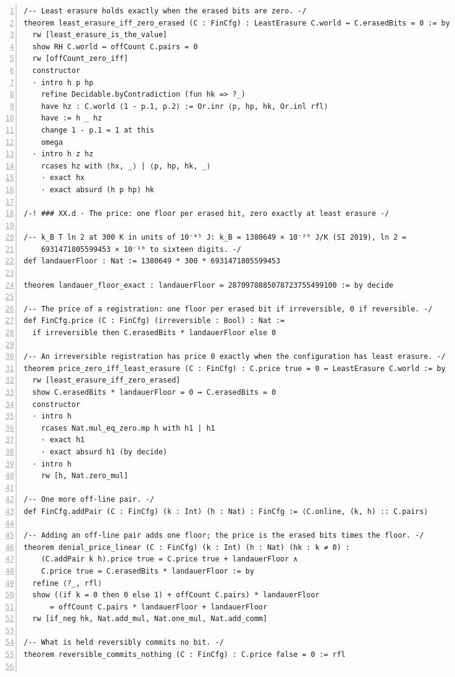\documentclass[10pt]{article}
\newcommand{\leansize}{\fontsize{5.5pt}{6.75pt}\selectfont}
\begin{document}
\begin{multicols}{2}
\begin{Verbatim}[numbers=left,firstnumber=1,numbersep=3pt,xleftmargin=2.6em,breaklines=true,breakanywhere=true,breakautoindent=false,breakindent=1.4em,breaksymbolleft={},breakanywheresymbolpre={},fontsize=\leansize]
/-- Least erasure holds exactly when the erased bits are zero. -/
theorem least_erasure_iff_zero_erased (C : FinCfg) : LeastErasure C.world ↔ C.erasedBits = 0 := by
  rw [least_erasure_is_the_value]
  show RH C.world ↔ offCount C.pairs = 0
  rw [offCount_zero_iff]
  constructor
  · intro h p hp
    refine Decidable.byContradiction (fun hk => ?_)
    have hz : C.world ⟨1 - p.1, p.2⟩ := Or.inr ⟨p, hp, hk, Or.inl rfl⟩
    have := h _ hz
    change 1 - p.1 = 1 at this
    omega
  · intro h z hz
    rcases hz with ⟨hx, _⟩ | ⟨p, hp, hk, _⟩
    · exact hx
    · exact absurd (h p hp) hk

/-! ### XX.d · The price: one floor per erased bit, zero exactly at least erasure -/

/-- k_B T ln 2 at 300 K in units of 10⁻⁴⁵ J: k_B = 1380649 × 10⁻²⁹ J/K (SI 2019), ln 2 =
    6931471805599453 × 10⁻¹⁶ to sixteen digits. -/
def landauerFloor : Nat := 1380649 * 300 * 6931471805599453

theorem landauer_floor_exact : landauerFloor = 2870978885078723755499100 := by decide

/-- The price of a registration: one floor per erased bit if irreversible, 0 if reversible. -/
def FinCfg.price (C : FinCfg) (irreversible : Bool) : Nat :=
  if irreversible then C.erasedBits * landauerFloor else 0

/-- An irreversible registration has price 0 exactly when the configuration has least erasure. -/
theorem price_zero_iff_least_erasure (C : FinCfg) : C.price true = 0 ↔ LeastErasure C.world := by
  rw [least_erasure_iff_zero_erased]
  show C.erasedBits * landauerFloor = 0 ↔ C.erasedBits = 0
  constructor
  · intro h
    rcases Nat.mul_eq_zero.mp h with h1 | h1
    · exact h1
    · exact absurd h1 (by decide)
  · intro h
    rw [h, Nat.zero_mul]

/-- One more off-line pair. -/
def FinCfg.addPair (C : FinCfg) (k : Int) (h : Nat) : FinCfg := ⟨C.online, (k, h) :: C.pairs⟩

/-- Adding an off-line pair adds one floor; the price is the erased bits times the floor. -/
theorem denial_price_linear (C : FinCfg) (k : Int) (h : Nat) (hk : k ≠ 0) :
    (C.addPair k h).price true = C.price true + landauerFloor ∧
    C.price true = C.erasedBits * landauerFloor := by
  refine ⟨?_, rfl⟩
  show ((if k = 0 then 0 else 1) + offCount C.pairs) * landauerFloor
      = offCount C.pairs * landauerFloor + landauerFloor
  rw [if_neg hk, Nat.add_mul, Nat.one_mul, Nat.add_comm]

/-- What is held reversibly commits no bit. -/
theorem reversible_commits_nothing (C : FinCfg) : C.price false = 0 := rfl


\end{Verbatim}
\end{multicols}
\end{document}
